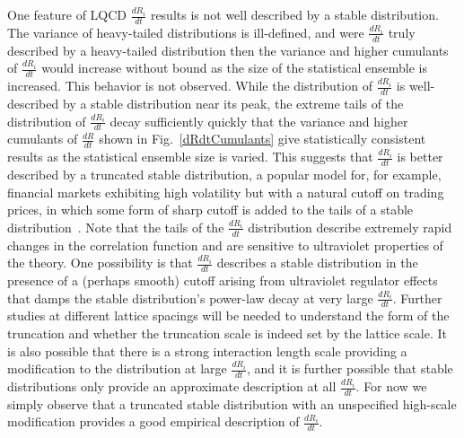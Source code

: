One feature of LQCD $\frac{dR_i}{dt}$ results is not well described by a stable distribution. 
The variance of heavy-tailed distributions is ill-defined, and were $\frac{dR_i}{dt}$ truly described by a heavy-tailed 
distribution then the variance and higher cumulants of $\frac{dR_i}{dt}$ would increase without bound as the size of the 
statistical ensemble is increased. 
This behavior is not observed. 
While the distribution of $\frac{dR_i}{dt}$ is well-described by a stable distribution near its peak, the extreme tails of the 
distribution of $\frac{dR_i}{dt}$ decay sufficiently quickly that the variance and higher cumulants of $\frac{dR}{dt}$ 
shown in Fig.~\ref{dRdtCumulants} give statistically consistent results as the statistical ensemble size is varied. 
This suggests that $\frac{dR_i}{dt}$ is better described by a truncated stable distribution, a popular model for,
for example,
financial markets exhibiting high volatility but with a natural cutoff on trading prices, in which some form of sharp cutoff 
is added to the tails of a stable distribution~\cite{Voit:2005}. 
Note that the tails of the $\frac{dR_i}{dt}$ 
distribution describe extremely rapid changes in the correlation function and are sensitive to ultraviolet properties of the theory. 
One possibility is that $\frac{dR_i}{dt}$ describes a stable distribution in the presence of a (perhaps smooth) cutoff arising from ultraviolet regulator effects that damps the stable distribution's power-law decay at very large $\frac{dR_i}{dt}$.
Further studies at different lattice spacings will be 
needed to understand the form of the truncation and whether the truncation scale is indeed set by the lattice scale. 
It is also possible that there is a strong interaction length scale providing a modification to the distribution at large 
$\frac{dR_i}{dt}$,
and it is further possible that stable distributions only provide an approximate description at all $\frac{dR_i}{dt}$.
For now we simply observe that a truncated stable distribution with an unspecified high-scale modification provides a 
good empirical description of $\frac{dR_i}{dt}$.





